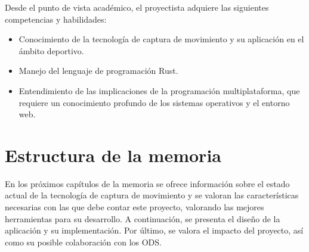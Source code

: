 Desde el punto de vista académico, el proyectista adquiere las siguientes competencias y habilidades:

\begin{itemize}
    \item Conocimiento de la tecnología de captura de movimiento y su aplicación en el ámbito deportivo.
    \item Manejo del lenguaje de programación Rust.
    \item Entendimiento de las implicaciones de la programación multiplataforma, que requiere un conocimiento profundo de los sistemas operativos y el entorno web.
\end{itemize}

\section{Estructura de la memoria}

En los próximos capítulos de la memoria se ofrece información sobre el estado actual de la tecnología de captura de movimiento y se valoran las características necesarias con las que debe contar este proyecto, valorando las mejores herramientas para su desarrollo. A continuación, se presenta el diseño de la aplicación y su implementación. Por último, se valora el impacto del proyecto, así como su posible colaboración con los \ac{ODS}.